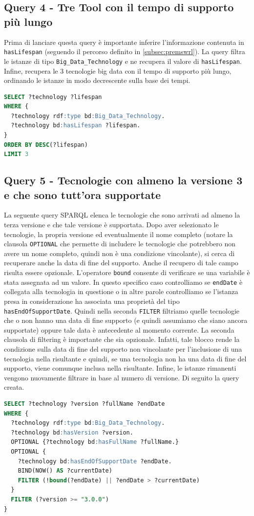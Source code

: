 \subsection{Query 4 - Tre Tool con il tempo di supporto più lungo}
Prima di lanciare questa query è importante inferire l'informazione contenuta in \texttt{hasLifespan} (seguendo il percorso definito in \ref{subsec:premswrl}). La query filtra le istanze di tipo \texttt{Big\_Data\_Technology} e ne recupera il valore di \texttt{hasLifespan}. Infine, recupera le 3 tecnologie big data con il tempo di supporto più lungo, ordinando le istanze in modo decrescente sulla base dei tempi.\\

\begin{lstlisting}[language=SQL]
SELECT ?technology ?lifespan
WHERE {
  ?technology rdf:type bd:Big_Data_Technology.
  ?technology bd:hasLifespan ?lifespan.
}
ORDER BY DESC(?lifespan)
LIMIT 3
\end{lstlisting}

\subsection{Query 5 - Tecnologie con almeno la versione 3 e che sono tutt'ora supportate}
La seguente query SPARQL elenca le tecnologie che sono arrivati ad almeno la terza versione e che tale versione è supportata. Dopo aver selezionato le tecnologie, la propria versione ed eventualmente il nome completo (notare la clausola \texttt{OPTIONAL} che permette di includere le tecnologie che potrebbero non avere un nome completo, quindi non è una condizione vincolante), si cerca di recuperare anche la data di fine del supporto. Anche il recupero di tale campo risulta essere opzionale. L'operatore \texttt{bound} consente di verificare se una variabile è stata assegnata ad un valore. In questo specifico caso controlliamo se \texttt{endDate} è collegata alla tecnologia in questione o in altre parole controlliamo se l'istanza presa in considerazione ha associata una proprietà del tipo \texttt{hasEndOfSupportDate}. Quindi nella seconda \texttt{FILTER} filtriamo quelle tecnologie che o non hanno una data di fine supporto (e quindi assumiamo che siano ancora supportate) oppure tale data è antecedente al momento corrente. La seconda clausola di filtering  è importante che sia opzionale. Infatti, tale blocco rende la condizione sulla data di fine del supporto non vincolante per l'inclusione di una tecnologia nella risultante e quindi, se una tecnologia non ha una data di fine del supporto, viene comunque inclusa nella risultante. Infine, le istanze rimanenti vengono nuovamente filtrare in base al numero di versione. Di seguito la query creata.
\newpage
\begin{lstlisting}[language=SQL]
SELECT ?technology ?version ?fullName ?endDate
WHERE {
  ?technology rdf:type bd:Big_Data_Technology.
  ?technology bd:hasVersion ?version.
  OPTIONAL {?technology bd:hasFullName ?fullName.}
  OPTIONAL {
    ?technology bd:hasEndOfSupportDate ?endDate.
    BIND(NOW() AS ?currentDate)
    FILTER (!bound(?endDate) || ?endDate > ?currentDate)
  }
  FILTER (?version >= "3.0.0")
}
\end{lstlisting}

